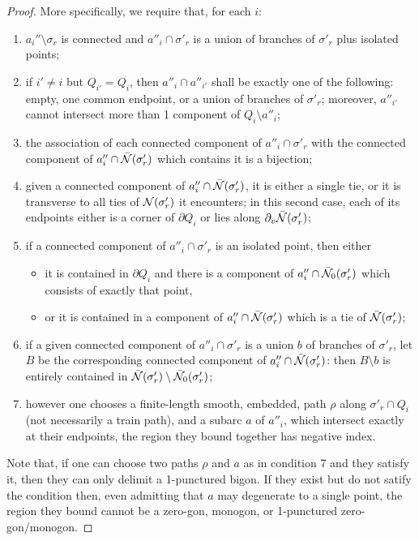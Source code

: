 \begin{proof}
More specifically, we require that, for each $i$:
\begin{enumerate}
\item $a_i''\setminus \sigma_r$ is connected and $a''_i\cap\sigma'_r$ is a union of branches of $\sigma'_r$ plus isolated points;
\item if $i'\not=i$ but $Q_{i'}=Q_i$, then $a''_i\cap a''_{i'}$ shall be exactly one of the following: empty, one common endpoint, or a union of branches of $\sigma'_r$; moreover, $a''_{i'}$ cannot intersect more than 1 component of $Q_i\setminus a''_i$;
\item the association of each connected component of $a''_i\cap\sigma'_r$ with the connected component of $a''_i\cap\bar{{\mathcal N}}(\sigma'_r)$ which contains it is a bijection; 
\item given a connected component of $a''_i\cap\bar{{\mathcal N}}(\sigma'_r)$, it is either a single tie, or it is transverse to all ties of ${\mathcal N}(\sigma'_r)$ it encounters; in this second case, each of its endpoints either is a corner of $\partial Q_i$ or lies along $\partial_v\bar{{\mathcal N}}(\sigma'_r)$;
\item if a connected component of $a''_i\cap\sigma'_r$ is an isolated point, then either
\begin{itemize}
\item it is contained in $\partial Q_i$ and there is a component of $a''_i\cap\bar{{\mathcal N}}_0(\sigma'_r)$ which consists of exactly that point,
\item or it is contained in a component of $a''_i\cap\bar{{\mathcal N}}(\sigma'_r)$ which is a tie of $\bar{{\mathcal N}}(\sigma'_r)$;
\end{itemize}
\item if a given connected component of $a''_i\cap\sigma'_r$ is a union $b$ of branches of $\sigma'_r$, let $B$ be the corresponding connected component of $a''_i\cap\bar{{\mathcal N}}(\sigma'_r)$: then $B\setminus b$ is entirely contained in $\bar{{\mathcal N}}(\sigma'_r)\setminus \bar{{\mathcal N}}_0(\sigma'_r)$;
\item however one chooses a finite-length smooth, embedded, path $\rho$ along $\sigma'_r\cap Q_i$ (not necessarily a train path), and a subarc $a$ of $a''_i$, which intersect exactly at their endpoints, the region they bound together has negative index.
\end{enumerate}

Note that, if one can choose two paths $\rho$ and $a$ as in condition 7 and they satisfy it, then they can only delimit a 1-punctured bigon. If they exist but do not satify the condition then, even admitting that $a$ may degenerate to a single point, the region they bound cannot be a zero-gon, monogon, or 1-punctured zero-gon/monogon.


\end{proof}
